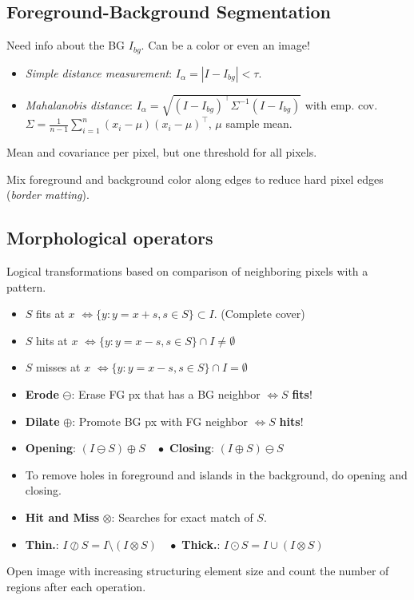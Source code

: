 \subsection{Foreground-Background Segmentation}
Need info about the BG \(I_{bg}\). Can be a color or even an image!
\begin{itemize}
  \item \textit{Simple distance measurement}: \(I_\alpha = |I - I_{bg}| < \tau\).
  \item \textit{Mahalanobis distance}: \(I_\alpha = \sqrt{(I - I_{bg})^\top \Sigma^{-1}(I - I_{bg})}\) with emp. cov. \(\Sigma = \frac{1}{n - 1} \sum_{i=1}^n (x_i - \mu) (x_i - \mu)^\top\), \(\mu\) sample mean.
\end{itemize}
Mean and covariance per pixel, but one threshold for all pixels.

\begin{definition}
  Mix foreground and background color along edges to reduce hard pixel edges (\textit{border matting}).
\end{definition}

\subsection{Morphological operators}
Logical transformations based on comparison of neighboring pixels with a pattern.

\begin{itemize}
  \item \(S\) fits at \(x\) \(\iff \{y : y = x + s, s \in S\} \subset I\). (Complete cover)
  \item \(S\) hits at \(x\) \(\iff \{y : y = x - s, s \in S\} \cap I \neq \emptyset\)
  \item \(S\) misses at \(x\) \(\iff \{y : y = x - s, s \in S\} \cap I = \emptyset\)
  \item \textbf{Erode} \(\ominus\): Erase FG px that has a BG neighbor \(\iff S\) \textbf{fits}!
  \item \textbf{Dilate} \(\oplus\): Promote BG px with FG neighbor \(\iff S\) \textbf{hits}!
  \item \textbf{Opening}: \((I \ominus S) \oplus S \quad \bullet\) \textbf{Closing}: \((I \oplus S) \ominus S\)
  \item To remove holes in foreground and islands in the background, do opening and closing.
  \item \textbf{Hit and Miss} \(\otimes\): Searches for exact match of $S$.
  \item \textbf{Thin.}: \(I \oslash S = I \setminus (I \otimes S) \quad \bullet\) \textbf{Thick.}: \(I \odot S = I \cup (I \otimes S)\)
\end{itemize}

\begin{definition}[Granulometry]
  Open image with increasing structuring element size and count the number of regions after each operation.
\end{definition}
